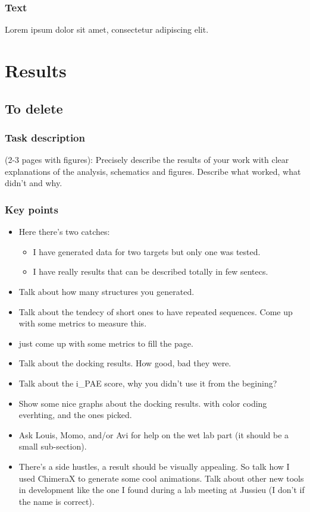 \documentclass[11pt,a4paper]{article}
\begin{document}
\subsubsection{Text}

Lorem ipsum dolor sit amet, consectetur adipiscing elit.

\section{Results}

\subsection{To delete}

\subsubsection{Task description}
(2-3 pages with figures):
Precisely describe the results of your work with clear explanations of 
the analysis, schematics and figures.
Describe what worked, what didn't and why.

\subsubsection{Key points}


\begin{itemize}
    \item Here there's two catches:
    \begin{itemize}
        \item I have generated data for two targets but only one was 
        tested.
        \item I have really results that can be described totally in 
        few sentecs.
    \end{itemize}
    \item Talk about how many structures you generated.
    \item Talk about the tendecy of short ones to have repeated 
    sequences. Come up with some metrics to measure this.
    \item just come up with some metrics to fill the page.
    \item Talk about the docking results. How good, bad they were.
    \item Talk about the i\_PAE score, why you didn't use it from the 
    begining?
    \item Show some nice graphs about the docking results. with color 
    coding everhting, and the ones picked.
    \item Ask Louis, Momo, and/or Avi for help on the wet lab part (it 
    should be a small sub-section).
    \item There's a side hustles, a result should be visually 
    appealing. So talk how I used ChimeraX to generate some cool 
    animations. Talk about other new tools in development like the one 
    I found during a lab meeting at Jussieu (I don't if the name is 
    correct). 
\end{itemize}
\end{document}
